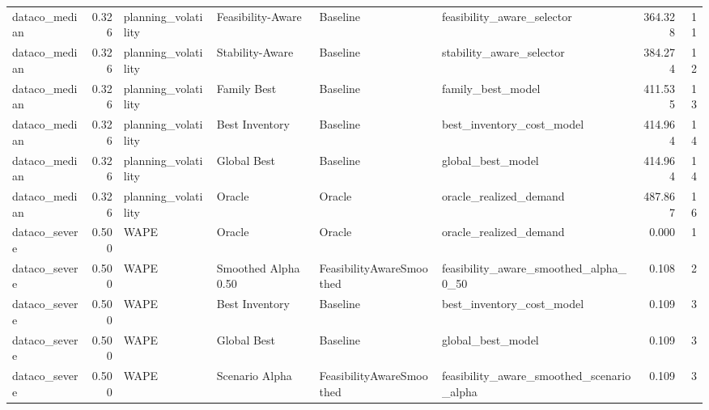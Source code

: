 \begin{table}
{\begin{tabular}{lrllllrr}
 dataco\_median &             0.326 &         planning\_volatility &     Feasibility-Aware &                  Baseline &                         feasibility\_aware\_selector &       364.328 &              11 \\
 dataco\_median &             0.326 &         planning\_volatility &       Stability-Aware &                  Baseline &                           stability\_aware\_selector &       384.274 &              12 \\
 dataco\_median &             0.326 &         planning\_volatility &           Family Best &                  Baseline &                                  family\_best\_model &       411.535 &              13 \\
 dataco\_median &             0.326 &         planning\_volatility &        Best Inventory &                  Baseline &                          best\_inventory\_cost\_model &       414.964 &              14 \\
 dataco\_median &             0.326 &         planning\_volatility &           Global Best &                  Baseline &                                  global\_best\_model &       414.964 &              14 \\
 dataco\_median &             0.326 &         planning\_volatility &                Oracle &                    Oracle &                             oracle\_realized\_demand &       487.867 &              16 \\
 dataco\_severe &             0.500 &                        WAPE &                Oracle &                    Oracle &                             oracle\_realized\_demand &         0.000 &               1 \\
 dataco\_severe &             0.500 &                        WAPE &   Smoothed Alpha 0.50 &  FeasibilityAwareSmoothed &              feasibility\_aware\_smoothed\_alpha\_0\_50 &         0.108 &               2 \\
 dataco\_severe &             0.500 &                        WAPE &        Best Inventory &                  Baseline &                          best\_inventory\_cost\_model &         0.109 &               3 \\
 dataco\_severe &             0.500 &                        WAPE &           Global Best &                  Baseline &                                  global\_best\_model &         0.109 &               3 \\
 dataco\_severe &             0.500 &                        WAPE &        Scenario Alpha &  FeasibilityAwareSmoothed &          feasibility\_aware\_smoothed\_scenario\_alpha &         0.109 &               3 \\

\end{tabular}}
\end{table}
